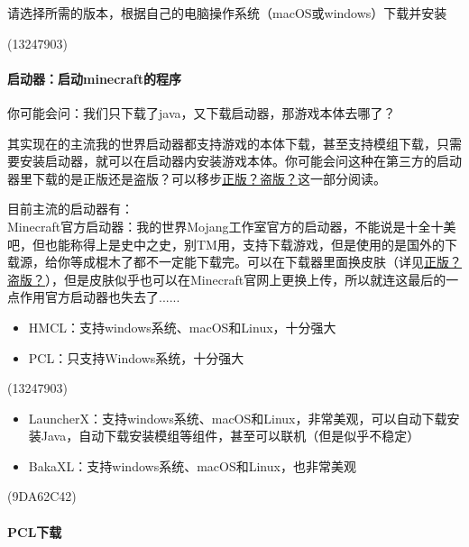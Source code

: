\documentclass[
]{article}
\providecommand{\tightlist}{%
  \setlength{\itemsep}{0pt}\setlength{\parskip}{0pt}}
\begin{document}
请选择所需的版本，根据自己的电脑操作系统（macOS或windows）下载并安装

\begin{flushright}(13247903)\end{flushright}

\paragraph{启动器：启动minecraft的程序}\label{minecraft-3}

你可能会问：我们只下载了java，又下载启动器，那游戏本体去哪了？

其实现在的主流我的世界启动器都支持游戏的本体下载，甚至支持模组下载，只需要安装启动器，就可以在启动器内安装游戏本体。你可能会问这种在第三方的启动器里下载的是正版还是盗版？可以移步\hyperref[section-3]{正版？盗版？}这一部分阅读。

目前主流的启动器有：\\
Minecraft官方启动器：我的世界Mojang工作室官方的启动器，不能说是十全十美吧，但也能称得上是史中之史，别TM用，支持下载游戏，但是使用的是国外的下载源，给你等成棍木了都不一定能下载完。可以在下载器里面换皮肤（详见\hyperref[section-3]{正版？盗版？}），但是皮肤似乎也可以在Minecraft官网上更换上传，所以就连这最后的一点作用官方启动器也失去了......

\begin{itemize}
\tightlist
\item
  HMCL：支持windows系统、macOS和Linux，十分强大
\item
  PCL：只支持Windows系统，十分强大
\end{itemize}

\begin{flushright}(13247903)\end{flushright}

\begin{itemize}
\tightlist
\item
  LauncherX：支持windows系统、macOS和Linux，非常美观，可以自动下载安装Java，自动下载安装模组等组件，甚至可以联机（但是似乎不稳定）
\item
  BakaXL：支持windows系统、macOS和Linux，也非常美观
\end{itemize}

\begin{flushright}(9DA62C42)\end{flushright}

\paragraph{PCL下载}\label{pcl}
\end{document}
